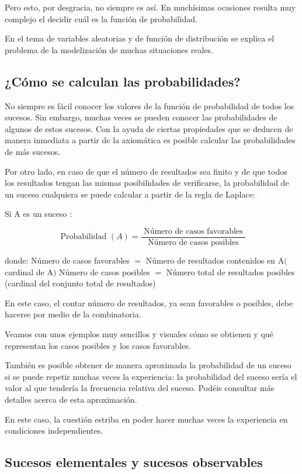\documentclass[
]{article}
\begin{document}
Pero esto, por desgracia, no siempre es así. En muchísimas ocasiones
resulta muy complejo el decidir cuál es la función de probabilidad.

En el tema de variables aleatorias y de función de distribución se
explica el problema de la modelización de muchas situaciones reales.

\subsection{¿Cómo se calculan las probabilidades?}\label{cuxf3mo-se-calculan-las-probabilidades}

No siempre es fácil conocer los valores de la función de probabilidad de
todos los sucesos. Sin embargo, muchas veces se pueden conocer las
probabilidades de algunos de estos sucesos. Con la ayuda de ciertas
propiedades que se deducen de manera inmediata a partir de la axiomática
es posible calcular las probabilidades de más sucesos.

Por otro lado, en caso de que el número de resultados sea finito y de
que todos los resultados tengan las mismas posibilidades de verificarse,
la probabilidad de un suceso cualquiera se puede calcular a partir de la
regla de Laplace:

Si A es un suceso :

\[
\text { Probabilidad }(A)=\frac{\text { Número de casos favorables }}{\text { Número de casos posibles }}
\]

donde: Número de casos favorables \(=\) Número de resultados contenidos en
\(\mathrm{A}(\) cardinal de A\()\) Número de casos posibles \(=\) Número total
de resultados posibles (cardinal del conjunto total de resultados)

En este caso, el contar número de resultados, ya sean favorables o
posibles, debe hacerse por medio de la combinatoria.

Veamos con unos ejemplos muy sencillos y visuales cómo se obtienen y qué
representan los casos posibles y los casos favorables.

También es posible obtener de manera aproximada la probabilidad de un
suceso si se puede repetir muchas veces la experiencia: la probabilidad
del suceso sería el valor al que tendería la frecuencia relativa del
suceso. Podéis consultar más detalles acerca de esta aproximación.

En este caso, la cuestión estriba en poder hacer muchas veces la
experiencia en condiciones independientes.

\subsection{Sucesos elementales y sucesos observables}\label{sucesos-elementales-y-sucesos-observables}
\end{document}
